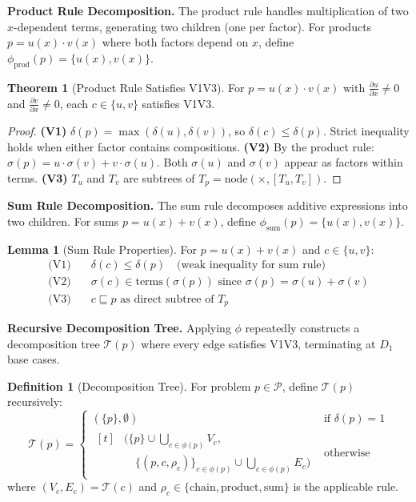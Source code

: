 \documentclass[a4paper,fleqn]{cas-dc}
\theoremstyle{definition}
\newtheorem{definition}{Definition}
\newtheorem{theorem}{Theorem}
\newtheorem{lemma}{Lemma}
\begin{document}
\noindent
\textbf{Product Rule Decomposition.}
The product rule handles multiplication of two $x$-dependent terms, generating two children (one per factor). For products $p = u(x) \cdot v(x)$ where both factors depend on $x$, define $\phi_{\text{prod}}(p) = \{u(x), v(x)\}$.

\begin{theorem}[Product Rule Satisfies V1\textendash V3]
\label{thm:product}
For $p = u(x) \cdot v(x)$ with $\frac{\partial u}{\partial x} \neq 0$ and $\frac{\partial v}{\partial x} \neq 0$, each $c \in \{u, v\}$ satisfies V1\textendash V3.
\end{theorem}

\begin{proof}
\textbf{(V1)} $\delta(p) = \max(\delta(u), \delta(v))$, so $\delta(c) \leq \delta(p)$. Strict inequality holds when either factor contains compositions.
\textbf{(V2)} By the product rule: $\sigma(p) = u \cdot \sigma(v) + v \cdot \sigma(u)$. Both $\sigma(u)$ and $\sigma(v)$ appear as factors within terms.
\textbf{(V3)} $T_u$ and $T_v$ are subtrees of $T_p = \text{node}(\times, [T_u, T_v])$.
\end{proof}
\noindent
\textbf{Sum Rule Decomposition.}
The sum rule decomposes additive expressions into two children. For sums $p = u(x) + v(x)$, define $\phi_{\text{sum}}(p) = \{u(x), v(x)\}$.

\noindent
\begin{lemma}[Sum Rule Properties]
\label{lem:sum}
For $p = u(x) + v(x)$ and $c \in \{u, v\}$:
\begin{align}
\text{(V1)} &\quad \delta(c) \leq \delta(p) \quad \text{(weak inequality for sum rule)} \\
\text{(V2)} &\quad \sigma(c) \in \text{terms}(\sigma(p)) \text{ since } \sigma(p) = \sigma(u) + \sigma(v) \\
\text{(V3)} &\quad c \sqsubseteq p \text{ as direct subtree of } T_p
\end{align}
\end{lemma}
\noindent
\textbf{Recursive Decomposition Tree.}
Applying $\phi$ repeatedly constructs a decomposition tree $\mathcal{T}(p)$ where every edge satisfies V1\textendash V3, terminating at $D_1$ base cases.
\noindent
\begin{definition}[Decomposition Tree]
\label{def:decomp_tree}
For problem $p \in \mathcal{P}$, define $\mathcal{T}(p)$ recursively:
\begin{equation}
\mathcal{T}(p) = \begin{cases}
(\{p\}, \emptyset) & \text{if } \delta(p) = 1 \\[6pt]
\begin{aligned}[t]
&\Big(\{p\} \cup \bigcup_{c \in \phi(p)} V_c, \\
&\quad \{(p, c, \rho_c)\}_{c \in \phi(p)} \cup \bigcup_{c \in \phi(p)} E_c\Big)
\end{aligned} & \text{otherwise}
\end{cases}
\end{equation}
where $(V_c, E_c) = \mathcal{T}(c)$ and $\rho_c \in \{\text{chain}, \text{product}, \text{sum}\}$ is the applicable rule.
\end{definition}
\end{document}
